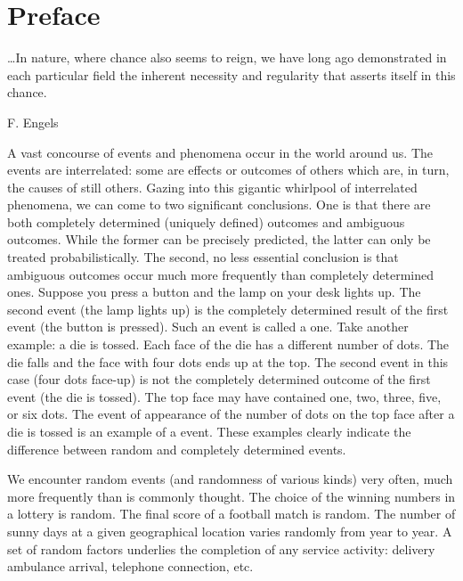 

\chapter*{Preface}
\label{ch-preface}

\epigraph{\ldots In nature, where chance also seems to reign, we have
  long ago demonstrated in each particular field the inherent
  necessity and regularity that asserts itself in this
  chance.}{F. Engels}



A vast concourse of events and phenomena occur in the world around
us. The events are interrelated: some are effects or outcomes of others
which are, in turn, the causes of still others. Gazing into this gigantic whirlpool of interrelated phenomena, we can come to two significant conclusions. One is that there are both completely determined (uniquely defined) outcomes and ambiguous outcomes. While the former can be precisely predicted, the latter can only be treated probabilistically. The second, no less essential conclusion is that ambiguous outcomes occur much more frequently than completely determined ones. Suppose you press a button and the lamp on your desk lights up. The second event (the lamp lights up) is the completely determined result of the first event (the button is pressed). Such an event is called a  one. Take another example: a die is tossed. Each face of the die has a different number of dots. The die falls and the face with four dots ends up at the top. The second event in this case (four dots face-up) is not the completely determined outcome of the first event (the die is tossed). The top face may have contained one, two, three, five, or six dots. The event of appearance of the number of dots on the top face after a die is tossed is an example of a  event. These examples clearly indicate the
difference between random and completely determined events.


We encounter random events (and randomness of various kinds) very
often, much more frequently than is commonly thought. The choice of
the winning numbers in a lottery is random. The final score of a
football match is random. The number of sunny days at a given
geographical location varies randomly from year to year. A set of
random factors underlies the completion of any service activity:
delivery ambulance arrival, telephone connection, etc.

